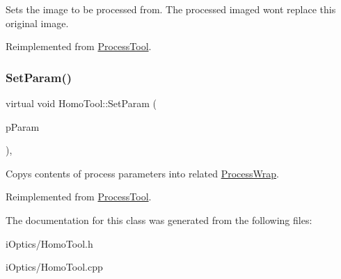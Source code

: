 Sets the image to be processed from. The processed imaged won\textquotesingle{}t replace this original image. 

Reimplemented from \mbox{\hyperlink{class_process_tool_a178bc06abf5a20220bd2306a14708a93}{Process\+Tool}}.

\mbox{\label{class_homo_tool_a69965855ba23da88abe7903ad58c20c6}} 
\subsubsection{\texorpdfstring{Set\+Param()}{SetParam()}}
{\footnotesize\ttfamily virtual void Homo\+Tool\+::\+Set\+Param (\begin{DoxyParamCaption}\item[{\mbox{\hyperlink{class_process_wrap}{Process\+Wrap}} $\ast$}]{p\+Param }\end{DoxyParamCaption})\hspace{0.3cm}{\ttfamily [inline]}, {\ttfamily [virtual]}}

Copys contents of process parameters into related \mbox{\hyperlink{class_process_wrap}{Process\+Wrap}}. 

Reimplemented from \mbox{\hyperlink{class_process_tool_a50caa175198cece00b39a146715bf3eb}{Process\+Tool}}.



The documentation for this class was generated from the following files\+:\begin{DoxyCompactItemize}
\item 
i\+Optics/Homo\+Tool.\+h\item 
i\+Optics/Homo\+Tool.\+cpp\end{DoxyCompactItemize}
